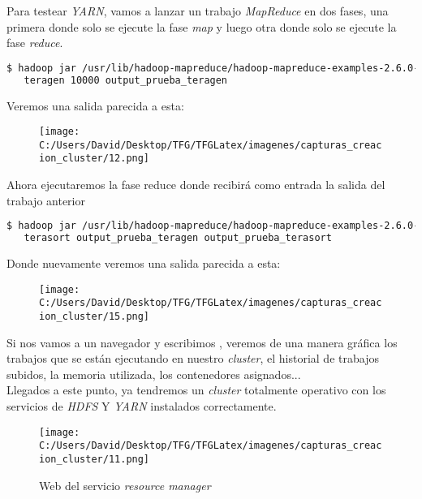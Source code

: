 \clearpage

Para testear \textit{YARN}, vamos a lanzar un trabajo \textit{MapReduce} en dos fases, una primera donde
solo se ejecute la fase \textit{map} y luego otra donde solo se ejecute la fase \textit{reduce}.

\begin{lstlisting}[language=bash, numbers=none]
$ hadoop jar /usr/lib/hadoop-mapreduce/hadoop-mapreduce-examples-2.6.0-cdh5.9.0.jar \
   teragen 10000 output_prueba_teragen
\end{lstlisting}

Veremos una salida parecida a esta:

\begin{figure}[!htpb]
  \centering
  \texttt{[image: C:/Users/David/Desktop/TFG/TFGLatex/imagenes/capturas\_creacion\_cluster/12.png]}
\end{figure}

Ahora ejecutaremos la fase reduce donde recibirá como entrada la salida del trabajo anterior

\begin{lstlisting}[language=bash, numbers=none]
$ hadoop jar /usr/lib/hadoop-mapreduce/hadoop-mapreduce-examples-2.6.0-cdh5.9.0.jar \
   terasort output_prueba_teragen output_prueba_terasort
\end{lstlisting}

Donde nuevamente veremos una salida parecida a esta:

\begin{figure}[!htpb]
  \centering
  \texttt{[image: C:/Users/David/Desktop/TFG/TFGLatex/imagenes/capturas\_creacion\_cluster/15.png]}
\end{figure}

Si nos vamos a un navegador y escribimos , veremos de una manera gráfica
los trabajos que se están ejecutando en nuestro \textit{cluster}, el historial de trabajos subidos, la
memoria utilizada, los contenedores asignados...\\
Llegados a este punto, ya tendremos un \textit{cluster} totalmente operativo con los servicios de
\textit{HDFS} Y \textit{YARN} instalados correctamente.

\begin{figure}[!htpb]
  \centering
  \texttt{[image: C:/Users/David/Desktop/TFG/TFGLatex/imagenes/capturas\_creacion\_cluster/11.png]}
  \caption[Web del servicio \textit{Resource Manager}]{Web del servicio \textit{resource manager}}
\end{figure}

